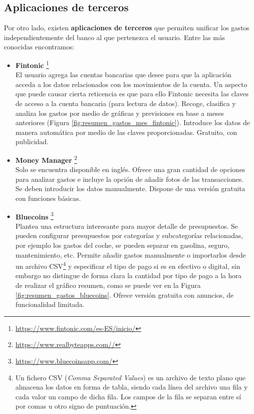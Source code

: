 \subsection{Aplicaciones de terceros}
Por otro lado, existen \textbf{aplicaciones de terceros} que permiten unificar los gastos 
independientemente del banco al que pertenezca el usuario. Entre las más conocidas 
encontramos:

\begin{itemize}
    \item \textbf{Fintonic} \footnote{\url{https://www.fintonic.com/es-ES/inicio/}} \\
    El usuario agrega las cuentas bancarias que desee para que la aplicación 
    acceda a los datos relacionados con los movimientos de la cuenta. 
    Un aspecto que puede causar cierta reticencia es que para ello Fintonic necesita las claves de acceso a la cuenta bancaria (para lectura de datos).
    Recoge, clasifica y analiza los gastos por medio de gráficas y previsiones en base a meses anteriores (Figura \ref{fig:resumen_gastos_mes_fintonic}).
    Introduce los datos de manera automática por medio de las claves proporcionadas. 
    Gratuito, con publicidad.

    \item \textbf{Money Manager}  \footnote{\url{https://www.realbyteapps.com//}} \\
    Solo se encuentra disponible en inglés. Ofrece una gran cantidad de opciones
    para analizar gastos e incluye la opción de añadir fotos de las transacciones. 
    Se deben introducir los datos manualmente. 
    Dispone de una versión gratuita con funciones básicas.

    \item \textbf{Bluecoins} \footnote{\url{https://www.bluecoinsapp.com/}} \\
    Plantea una estructura interesante para mayor detalle de presupuestos. 
    Se pueden configurar presupuestos por categorías y subcategorías relacionadas, por ejemplo 
    los gastos del coche, se pueden separar en gasolina, seguro, mantenimiento, etc. 
    Permite añadir gastos manualmente o importarlos desde un archivo CSV\footnote{Un fichero CSV (\textit{Comma Separated Values}) es un archivo de texto plano 
    que almacena los datos en forma de tabla, siendo cada línea del archivo una fila y 
    cada valor un campo de dicha fila. Los campos de la fila se separan entre sí por comas 
    u otro signo de puntuación.} y especificar 
    el tipo de pago si es en efectivo o digital, sin embargo no distingue de forma clara la cantidad por tipo de pago a la hora de realizar el gráfico resumen, como se puede ver en la Figura \ref{fig:resumen_gastos_bluecoins}. 
    Ofrece versión gratuita con anuncios, de funcionalidad limitada.


\end{itemize}
